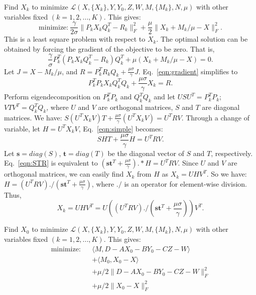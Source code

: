 \begin{senumerate}
\item Find $X_{k}$ to minimize
$\mathcal{L}(X,\{X_k\},Y,Y_0,Z,W,M,\{M_k\},N,\mu)$ with other
variables fixed $(k = 1,2,...,K)$. This gives:
\[
\text{minimize:}~\frac{\gamma}{2\sigma} \|P_k X_k Q_k^T-R_k\|_F^2 + \frac{\mu}{2} \|X_k+M_k/\mu-X\|_F^2.
\]
This is a least square problem with respect to $X_k$.  The
optimal solution can be obtained by forcing the gradient of the
objective to be zero. That is,
\begin{equation}
\frac{\gamma}{\sigma} P_{k}^T (P_{k} X_{k} Q_{k}^T-R_{k})Q_{k}^T + \mu (X_{k}+M_{k}/\mu-X) = 0.
\label{eqn:gradient}
\end{equation}
Let $J = X-M_{k}/\mu$, and $R = P_{k}^T R_{k} Q_{k} + \frac{\mu\sigma}{\gamma}
J$.
Eq.~\eqref{eqn:gradient} simplifies to
\begin{equation}
P_k^T P_k X_k Q_k^T Q_k + \frac{\mu\sigma}{\gamma} X_k = R.
\label{eqn:simple}
\end{equation}
Perform eigendecomposition on $P_k^T P_k$ and $Q_k^T Q_k$ and let
$USU^T = P_{k}^T P_{k}$; $VTV^T = Q_{k}^T Q_{k}$, where $U$ and $V$
are orthogonal matrices, $S$ and $T$ are diagonal matrices.  We have:
$S(U^T X_k V)T + \frac{\mu\sigma}{\gamma} (U^T X_k V) = U^T R V$.  Through a
change of variable, let $H = U^T X_k V$, Eq.~\eqref{eqn:simple}
becomes:
\begin{equation}
  SHT + \frac{\mu\sigma}{\gamma} H = U^T R V.
\label{eqn:STR}
\end{equation}
Let $\mathbf{s} = diag(S)$, $\mathbf{t} = diag(T)$ be the diagonal
vector of $S$ and $T$, respectively.  Eq.~\eqref{eqn:STR} is
equivalent to $(\mathbf{s} \mathbf{t}^T+\frac{\mu\sigma}{\gamma}).*H = U^TRV$.
Since $U$ and $V$ are orthogonal matrices, we can easily find $X_k$
from $H$ as $X_k=U H V^T$.  So we have: \( H = (U^TRV)./(\mathbf{s}
\mathbf{t}^T+\frac{\mu\sigma}{\gamma}) \), where $./$ is an operator for
element-wise division.  Thus,
\[X_k = U H V^T = U\left((U^TRV)./(\mathbf{s}
\mathbf{t}^T+\frac{\mu\sigma}{\gamma})\right)V^T.\]

\item Find $X_{0}$ to minimize
  $\mathcal{L}(X,\{X_k\},Y,Y_0,Z,W,M,\{M_k\},N,\mu)$ with other
  variables fixed $(k = 1,2,...,K)$. This gives:
\begin{eqnarray}
  \text{minimize:} && \langle M,D-A X_{0}-BY_0-CZ-W \rangle\nonumber\\
  && + \langle M_{0},X_{0}-X \rangle\nonumber\\
  && + \mu/2 \|D-AX_{0}-BY_0-CZ-W\|_F^2\nonumber\\
  && + \mu/2 \|X_{0}-X\|_F^2\nonumber
\end{eqnarray}


\end{senumerate}

